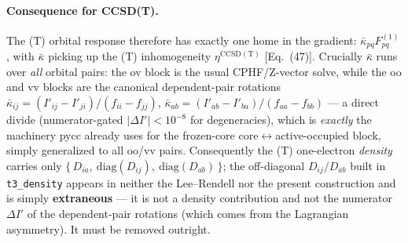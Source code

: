 \documentclass[11pt]{article}
\begin{document}
\paragraph{Consequence for CCSD(T).}
The (T) orbital response therefore has exactly one home in the gradient:
$\bar\kappa_{pq}F^{(1)}_{pq}$, with $\bar\kappa$ picking up the (T) inhomogeneity
$\eta^{\mathrm{CCSD(T)}}$ [Eq.~(47)]. Crucially $\bar\kappa$ runs over \emph{all} orbital pairs:
the ov block is the usual CPHF/Z-vector solve, while the oo and vv blocks are the canonical
dependent-pair rotations
$\bar\kappa_{ij}=(I'_{ij}-I'_{ji})/(f_{ii}-f_{jj})$,
$\bar\kappa_{ab}=(I'_{ab}-I'_{ba})/(f_{aa}-f_{bb})$ --- a direct divide (numerator-gated
$|\Delta I'|<10^{-8}$ for degeneracies), which is \emph{exactly} the machinery pycc already uses
for the frozen-core core$\leftrightarrow$active-occupied block, simply generalized to all oo/vv
pairs. Consequently the (T) one-electron \emph{density} carries only
$\{\,D_{ia},\ \mathrm{diag}(D_{ij}),\ \mathrm{diag}(D_{ab})\,\}$; the off-diagonal
$D_{ij}/D_{ab}$ built in \texttt{t3\_density} appears in neither the Lee--Rendell nor the
present construction and is simply \textbf{extraneous} --- it is not a density contribution and
not the numerator $\Delta I'$ of the dependent-pair rotations (which comes from the Lagrangian
asymmetry). It must be removed outright.
\end{document}
